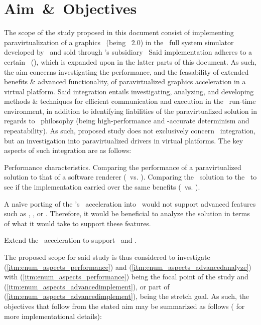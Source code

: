 
\chapter{Aim~\&~Objectives}
\label{cha:aimandobjectives}
The scope of the study proposed in this document consist of implementing paravirtualization of a graphics \termapi\ (being \termopengles ~2.0) in the \termsimics\ full system simulator developed by \termintel\ and sold through \termintel 's subsidiary \termwindriver\
Said implementation adheres to a certain \termrefimpl\ (), which is expanded upon in the latter parts of this document.
As such, the aim concerns investigating the performance, and the feasability of extended benefits \& advanced functionality, of paravirtualized graphics acceleration in a virtual platform.
Said integration entails investigating, analyzing, and developing methods \& techniques for efficient communication and execution in the \termsimics\ run-time environment, in addition to identifying liabilities of the paravirtualized solution in regards to \termsimics\ philosophy (being high-performance and \termtiming -accurate determinism and repeatability).
As such, proposed study does not exclusively concern \termsimics\ integration, but an investigation into paravirtualized drivers in virtual platforms.
The key aspects of such integration are as follows:
\begin{enumerate*}
	\item \label{itm:enum_aspects_performance} Performance characteristics.
	Comparing the performance of a paravirtualized solution to that of a software renderer (\termsimics\ vs. \termsimics ).
	Comparing the \termsimics\ solution to the \termrefsolu\ to see if the implementation carried over the same benefits (\termsimics\ vs. \termrefsolu ).
	\item \label{itm:enum_aspects_advancedanalyze} A naïve porting of the \termrefimpl 's \termopengles\ acceleration into \termsimics\ would not support advanced features such as \termdetexe , \termcheckpointing , or \termrevexe .
	Therefore, it would be beneficial to analyze the solution in terms of what it would take to support these features.
	\item \label{itm:enum_aspects_advancedimplement} Extend the \termopengles\ acceleration to support \termcheckpointing\ and \termrevexe .
\end{enumerate*}
The proposed scope for said study is thus considered to investigate (\ref{itm:enum_aspects_performance}) and (\ref{itm:enum_aspects_advancedanalyze}) with (\ref{itm:enum_aspects_performance}) being the focal point of the study and (\ref{itm:enum_aspects_advancedimplement}), or part of (\ref{itm:enum_aspects_advancedimplement}), being the stretch goal.
As such, the objectives that follow from the stated aim may be summarized as follows (\dvcmdrefsee{\dvcmdrefcha{cha:researchmethodology}} for more implementational details):

